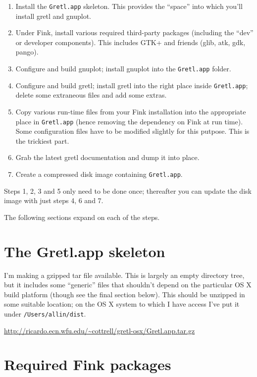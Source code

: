\documentclass{article}
\begin{document}
\begin{enumerate}
\item Install the \texttt{Gretl.app} skeleton.  This provides the
  ``space'' into which you'll install gretl and gnuplot.
\item Under Fink, install various required third-party packages
  (including the ``dev'' or developer components).  This includes
  GTK+ and friends (glib, atk, gdk, pango).
\item Configure and build gnuplot; install gnuplot into
  the \texttt{Gretl.app} folder.
\item Configure and build gretl; install gretl into the right place
  inside \texttt{Gretl.app}; delete some extraneous files and add some
  extras.
\item Copy various run-time files from your Fink installation into the
  appropriate place in \texttt{Gretl.app} (hence removing the
  dependency on Fink at run time).  Some configuration files have to
  be modified slightly for this putpose.  This is the trickiest part.
\item Grab the latest gretl documentation and dump it into place.
\item Create a compressed disk image containing \texttt{Gretl.app}.
\end{enumerate}

Steps 1, 2, 3 and 5 only need to be done once; thereafter you can
update the disk image with just steps 4, 6 and 7.

The following sections expand on each of the steps.

\section{The Gretl.app skeleton}

I'm making a gzipped tar file available.  This is largely an empty
directory tree, but it includes some ``generic'' files that shouldn't
depend on the particular OS X build platform (though see the final
section below).  This should be unzipped in some suitable location; on
the OS X system to which I have access I've put it under
\texttt{/Users/allin/dist}.

\url{http://ricardo.ecn.wfu.edu/~cottrell/gretl-osx/Gretl.app.tar.gz}

\section{Required Fink packages}
\end{document}
